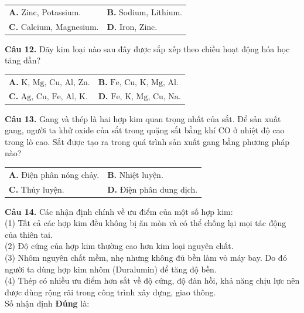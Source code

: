 \documentclass{article}
\begin{document}
\begin{tabularx}{\linewidth}{@{}X X@{}}
\textbf{A.} Zinc, Potassium. & \textbf{B.} Sodium, Lithium.\\[8pt]
\textbf{C.} Calcium, Magnesium. & \textbf{D.} Iron, Zinc.
\end{tabularx}

\vspace*{\fill}

\textbf{Câu 12.} Dãy kim loại nào sau đây được sắp xếp theo chiều hoạt động hóa học tăng dần?
\vspace{6pt}

\begin{tabularx}{\linewidth}{@{}X X@{}}
\textbf{A.} $\text{K, Mg, Cu, Al, Zn}$. & \textbf{B.} $\text{Fe, Cu, K, Mg, Al}$.\\[8pt]
\textbf{C.} $\text{Ag, Cu, Fe, Al, K}$. & \textbf{D.} $\text{Fe, K, Mg, Cu, Na}$.
\end{tabularx}
\vspace*{\fill}
\newpage

\fontsize{26}{34}\selectfont
\textbf{Câu 13.} Gang và thép là hai hợp kim quan trọng nhất của sắt. Để sản xuất gang, người ta khử oxide của sắt trong quặng sắt bằng khí $\text{CO}$ ở nhiệt độ cao trong lò cao. Sắt được tạo ra trong quá trình sản xuất gang bằng phương pháp nào?
\vspace{16pt}

\begin{tabularx}{\linewidth}{@{}X X@{}}
\textbf{A.} Điện phân nóng chảy. & \textbf{B.} Nhiệt luyện.\\[12pt]
\textbf{C.} Thủy luyện. & \textbf{D.} Điện phân dung dịch.
\end{tabularx}

\vspace*{\fill}
\newpage

\fontsize{24}{32}\selectfont
\textbf{Câu 14.} Các nhận định chính về ưu điểm của một số hợp kim:\\
(1) Tất cả các hợp kim đều không bị ăn mòn và có thể chống lại mọi tác động của thiên tai.\\
(2) Độ cứng của hợp kim thường cao hơn kim loại nguyên chất.\\
(3) Nhôm nguyên chất mềm, nhẹ nhưng không đủ bền làm vỏ máy bay. Do đó người ta dùng hợp kim nhôm (Duralumin) để tăng độ bền.\\
(4) Thép có nhiều ưu điểm hơn sắt về độ cứng, độ đàn hồi, khả năng chịu lực nên được dùng rộng rãi trong công trình xây dựng, giao thông.\\
Số nhận định \textbf{Đúng} là:
\vspace{12pt}
\end{document}
